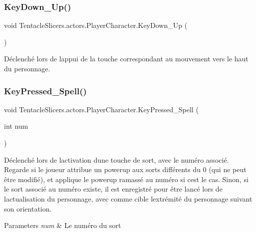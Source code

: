 \subsubsection{\texorpdfstring{Key\+Down\+\_\+\+Up()}{KeyDown\_Up()}}
{\footnotesize\ttfamily void Tentacle\+Slicers.\+actors.\+Player\+Character.\+Key\+Down\+\_\+\+Up (\begin{DoxyParamCaption}{ }\end{DoxyParamCaption})}



Déclenché lors de l\textquotesingle{}appui de la touche correspondant au mouvement vers le haut du personnage. 

\mbox{\label{class_tentacle_slicers_1_1actors_1_1_player_character_a5014d03cdb591f545e08f599cf314770}} 
\subsubsection{\texorpdfstring{Key\+Pressed\+\_\+\+Spell()}{KeyPressed\_Spell()}}
{\footnotesize\ttfamily void Tentacle\+Slicers.\+actors.\+Player\+Character.\+Key\+Pressed\+\_\+\+Spell (\begin{DoxyParamCaption}\item[{int}]{num }\end{DoxyParamCaption})}



Déclenché lors de l\textquotesingle{}activation d\textquotesingle{}une touche de sort, avec le numéro associé. Regarde si le joueur attribue un powerup aux sorts différents du 0 (qui ne peut être modifié), et applique le powerup ramassé au numéro si c\textquotesingle{}est le cas. Sinon, si le sort associé au numéro existe, il est enregistré pour être lancé lors de l\textquotesingle{}actualisation du personnage, avec comme cible l\textquotesingle{}extrémité du personnage suivant son orientation. 


\begin{DoxyParams}{Parameters}
{\em num} & Le numéro du sort \\
\hline
\end{DoxyParams}
\mbox{\label{class_tentacle_slicers_1_1actors_1_1_player_character_a7c674d55517b678e1ef3e56eef87020b}} 
